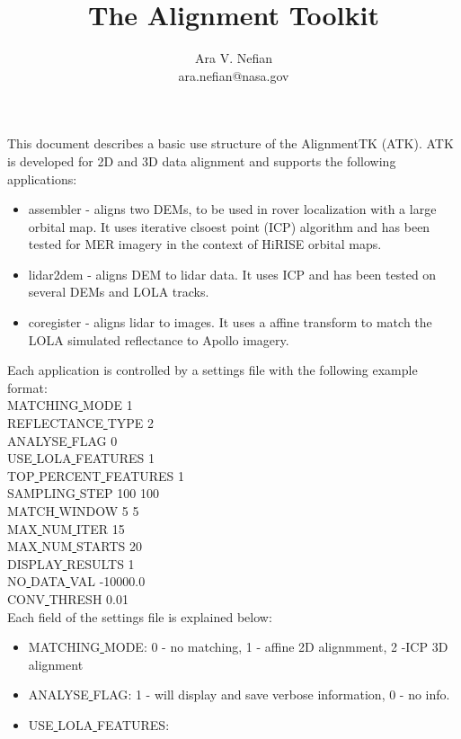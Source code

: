 \documentclass[12pt]{article}
\begin{document}
\title {The Alignment Toolkit}
\author{Ara V. Nefian\\
ara.nefian@nasa.gov}
\maketitle

This document describes a basic use structure of the AlignmentTK (ATK). ATK is developed for 2D and 3D data alignment and supports the 
following applications:
\begin{itemize}
\item assembler - aligns two DEMs, to be used in rover localization with a large orbital map. It uses iterative clsoest point (ICP) algorithm and has 
been tested for MER imagery in the context of HiRISE orbital maps.
\item lidar2dem - aligns DEM to lidar data. It uses ICP and has been tested on several DEMs and LOLA tracks.
\item coregister - aligns lidar to images. It uses a affine transform to match the LOLA simulated reflectance to Apollo imagery. 
\end{itemize} 

Each application is controlled by a settings file with the following example format:\\
MATCHING\underline{ }MODE 1\\
REFLECTANCE\underline{ }TYPE 2\\
ANALYSE\underline{ }FLAG 0\\
USE\underline{ }LOLA\underline{ }FEATURES 1\\
TOP\underline{ }PERCENT\underline{ }FEATURES 1\\
SAMPLING\underline{ }STEP 100 100\\
MATCH\underline{ }WINDOW 5 5\\
MAX\underline{ }NUM\underline{ }ITER 15\\
MAX\underline{ }NUM\underline{ }STARTS 20\\
DISPLAY\underline{ }RESULTS 1\\
NO\underline{ }DATA\underline{ }VAL -10000.0\\
CONV\underline{ }THRESH 0.01\\

Each field of the settings file is explained below:
\begin{itemize}
\item{MATCHING\underline{ }MODE}: 0 - no matching, 1 - affine 2D alignmment, 2 -ICP 3D alignment\\
\item{ANALYSE\underline{ }FLAG}:  1 - will display and save verbose information, 0 - no info.\\
\item{USE\underline{ }LOLA\underline{ }FEATURES}:  
\end{itemize}
\end{document}
